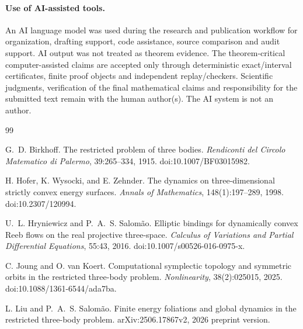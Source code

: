 \documentclass[11pt]{article}
\begin{document}
\paragraph{Use of AI-assisted tools.} An AI language model was used during the research and publication workflow for organization, drafting support, code assistance, source comparison and audit support. AI output was not treated as theorem evidence. The theorem-critical computer-assisted claims are accepted only through deterministic exact/interval certificates, finite proof objects and independent replay/checkers. Scientific judgments, verification of the final mathematical claims and responsibility for the submitted text remain with the human author(s). The AI system is not an author.

\begin{thebibliography}{99}

G.~D. Birkhoff.
\newblock The restricted problem of three bodies.
\newblock \emph{Rendiconti del Circolo Matematico di Palermo}, 39:265--334, 1915.
\newblock doi:10.1007/BF03015982.

H. Hofer, K. Wysocki, and E. Zehnder.
\newblock The dynamics on three-dimensional strictly convex energy surfaces.
\newblock \emph{Annals of Mathematics}, 148(1):197--289, 1998.
\newblock doi:10.2307/120994.

U.~L. Hryniewicz and P.~A.~S. Salom\~ao.
\newblock Elliptic bindings for dynamically convex Reeb flows on the real projective three-space.
\newblock \emph{Calculus of Variations and Partial Differential Equations}, 55:43, 2016.
\newblock doi:10.1007/s00526-016-0975-x.

C. Joung and O. van Koert.
\newblock Computational symplectic topology and symmetric orbits in the restricted three-body problem.
\newblock \emph{Nonlinearity}, 38(2):025015, 2025.
\newblock doi:10.1088/1361-6544/ada7ba.

L. Liu and P.~A.~S. Salom\~ao.
\newblock Finite energy foliations and global dynamics in the restricted three-body problem.
\newblock arXiv:2506.17867v2, 2026 preprint version.

\end{thebibliography}
\end{document}
